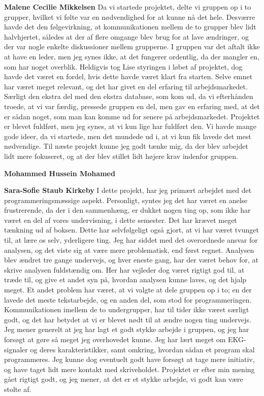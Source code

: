 \textbf{Malene Cecilie Mikkelsen}
Da vi startede projektet, delte vi gruppen op i to grupper, hvilket vi følte var en nødvendighed for at kunne nå det hele. Desværre havde det den følgevirkning, at kommunikationen mellem de to grupper blev lidt halvhjertet, således at der af flere omgange blev brug for at lave ændringer, og der var nogle enkelte diskussioner mellem grupperne. I gruppen var det aftalt ikke at have en leder, men jeg synes ikke, at det fungerer ordentlig, da der mangler en, som har noget overblik. Heldigvis tog Lise styringen i løbet af projektet, dog havde det været en fordel, hvis dette havde været klart fra starten. 
Selve emnet har været meget relevant, og det har givet en del erfaring til arbejdsmarkedet. Særligt den ekstra del med den ekstra database, som kom ud, da vi efterhånden troede, at vi var færdig, pressede gruppen en del, men gav en erfaring med, at det er sådan noget, som man kan komme ud for senere på arbejdsmarkedet.
Projektet er blevet fuldført, men jeg synes, at vi kun lige har fuldført den. Vi havde mange gode ideer, da vi startede, men det mundede ud i, at vi kun fik lavede det mest nødvendige. Til næste projekt kunne jeg godt tænke mig, da der blev arbejdet lidt mere fokuseret, og at der blev stillet lidt højere krav indenfor gruppen.

\textbf{Mohammed Hussein Mohamed}

\textbf{Sara-Sofie Staub Kirkeby}
I dette projekt, har jeg primært arbejdet med det programmeringsmæssige aspekt. Personligt, syntes jeg det har været en anelse frustrerende, da der i den sammenhæng, er dukket nogen ting op, som ikke har været en del af vores undervisning, i dette semester. Det har krævet meget tænkning ud af boksen. Dette har selvfølgeligt også gjort, at vi har været tvunget til, at lære os selv, yderligere ting. 
Jeg har siddet med det overordnede ansvar for analysen, og det viste sig at være mere problematisk, end først regnet. Analysen blev ændret tre gange undervejs, og hver eneste gang, har der været behov for, at skrive analysen fuldstændig om. Her har vejleder dog været rigtigt god til, at træde til, og give et andet syn på, hvordan analysen kunne laves, og det hjalp meget. 
Et andet problem har været, at vi valgte at dele gruppen op i to; en der lavede det meste tekstarbejde, og en anden del, som stod for programmeringen. Kommunikationen imellem de to undergrupper, har til tider ikke været særligt godt, og det har betydet at vi er blevet nødt til at ændre nogen ting undervejs. 
Jeg mener generelt at jeg har lagt et godt stykke arbejde i gruppen, og jeg har forsøgt at gøre så meget jeg overhovedet kunne. Jeg har lært meget om EKG-signaler og deres karakteristikker, samt omkring, hvordan sådan et program skal programmeres. Jeg kunne dog eventuelt godt have forsøgt at tage mere initiativ, og have taget lidt mere kontakt med skriveholdet. 
Projektet er efter min mening gået rigtigt godt, og jeg mener, at det er et stykke arbejde, vi godt kan være stolte af.

